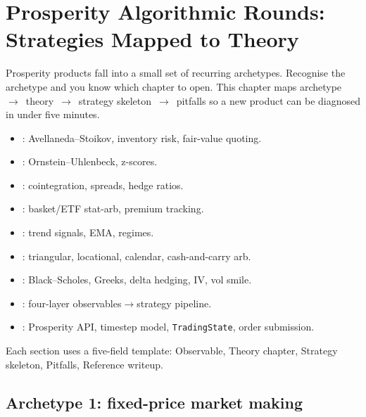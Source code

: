 \chapter{Prosperity Algorithmic Rounds: Strategies Mapped to Theory}
\label{ch:algo_rounds}

Prosperity products fall into a small set of recurring archetypes.
Recognise the archetype and you know which chapter to open.  This
chapter maps archetype~$\to$~theory~$\to$~strategy skeleton~$\to$~pitfalls
so a new product can be diagnosed in under five minutes.

\begin{backgroundbox}[Prerequisites]
\begin{itemize}
  \item {}: Avellaneda--Stoikov, inventory risk,
  fair-value quoting.
  \item {}: Ornstein--Uhlenbeck, z-scores.
  \item {}: cointegration, spreads,
  hedge ratios.
  \item {}: basket/ETF stat-arb, premium
  tracking.
  \item {}: trend signals, EMA, regimes.
  \item {}: triangular, locational, calendar,
  cash-and-carry arb.
  \item {}:
  Black--Scholes, Greeks, delta hedging, IV, vol smile.
  \item {}: four-layer observables$\to$strategy
  pipeline.
  \item {}: Prosperity API, timestep model,
  \texttt{TradingState}, order submission.
\end{itemize}
\end{backgroundbox}

Each section uses a five-field template: Observable, Theory
chapter, Strategy skeleton, Pitfalls, Reference writeup.

\section{Archetype 1: fixed-price market making}
\label{sec:archetype_mm}

